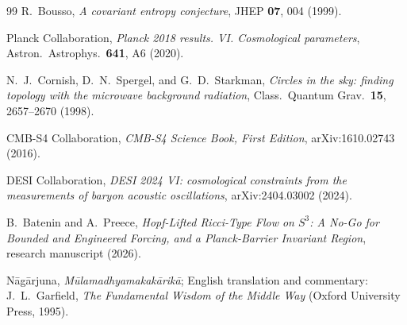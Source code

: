 \documentclass[11pt,a4paper]{article}
\theoremstyle{definition}
\theoremstyle{remark}
\newcommand{\Sthree}{S^{3}}
\begin{document}
\begin{thebibliography}{99}
R.~Bousso, \emph{A covariant entropy conjecture}, JHEP \textbf{07}, 004 (1999).

Planck Collaboration, \emph{Planck 2018 results. VI. Cosmological parameters},
Astron.\ Astrophys.\ \textbf{641}, A6 (2020).

N.~J.~Cornish, D.~N.~Spergel, and G.~D.~Starkman,
\emph{Circles in the sky: finding topology with the microwave background radiation},
Class.\ Quantum Grav.\ \textbf{15}, 2657--2670 (1998).

CMB-S4 Collaboration, \emph{CMB-S4 Science Book, First Edition}, arXiv:1610.02743 (2016).

DESI Collaboration, \emph{DESI 2024 VI: cosmological constraints from the measurements of baryon
acoustic oscillations}, arXiv:2404.03002 (2024).

B.~Batenin and A.~Preece, \emph{Hopf-Lifted Ricci-Type Flow on $\Sthree$: A No-Go for Bounded
and Engineered Forcing, and a Planck-Barrier Invariant Region}, research manuscript (2026).

N\=ag\=arjuna, \emph{M\=ulamadhyamakak\=arik\=a}; English translation and commentary:
J.~L.~Garfield, \emph{The Fundamental Wisdom of the Middle Way} (Oxford University Press, 1995).

\end{thebibliography}
\end{document}
